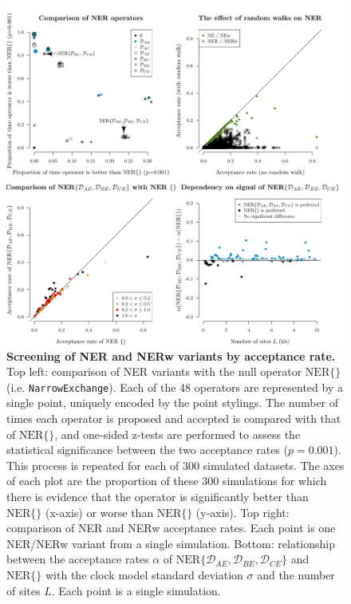 \documentclass[10pt,letterpaper]{article}
\begin{document}
\begin{figure}[!h]
\includegraphics[width=\textwidth]{Figures/acceptanceRates.pdf}
\caption{\textbf{Screening of NER and NERw variants by acceptance rate.} Top left: comparison of NER variants with the null operator $\text{NER}\{\}$ (i.e. \texttt{NarrowExchange}). Each of the 48 operators are represented by a single point, uniquely encoded by the point stylings. The number of times each operator is proposed and accepted is compared with that of $\text{NER}\{\}$, and one-sided z-tests are performed to assess the statistical significance between the two acceptance rates ($p = 0.001$).  This process is repeated for each of $300$ simulated datasets. The axes of each plot are the proportion of these $300$ simulations for which there is evidence that the operator is significantly better than $\text{NER}\{\}$ (x-axis) or worse than $\text{NER}\{\}$ (y-axis). Top right: comparison of NER and NERw acceptance rates. Each point is one NER/NERw variant from a single simulation. Bottom: relationship between the acceptance rates $\alpha$ of $\text{NER}\{\mathcal{D}_{AE}, \mathcal{D}_{BE}, \mathcal{D}_{CE}\}$ and $\text{NER}\{ \}$ with the clock model standard deviation $\sigma$ and the number of sites $L$.  Each point is a single simulation. }
\label{fig:acceptanceRateScreening}
\end{figure}
\end{document}
